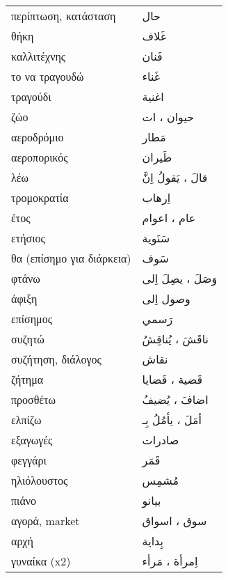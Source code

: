 \documentclass[twocolumn,a4paper]{article}
\newcommand{\ar}[1]{\textarabic{#1}}
\newcommand{\pl}{\raisebox{0.15ex}{\footnotesize ◍}}
\newcommand{\normpl}[1]{\ar{ #1، ات }}
\newcommand{\vrf}{\raisebox{0.15ex}{\footnotesize ◉}}
\newcommand{\mas}{\raisebox{0.15ex}{\footnotesize ◫}}
\begin{document}
\begin{mpsupertabular}{ P{0.5\textwidth} P{0.5\textwidth} }
περίπτωση, κατάσταση         & \ar{ حال } \\
θήκη                         & \ar{ غَلاف } \\
καλλιτέχνης                  & \ar{ فَنان } \\
το να τραγουδώ  \mas         & \ar{ غَناء } \\
τραγούδι                     & \ar{ اغنية } \\
ζώο \pl                      & \normpl{ حيوان } \\
αεροδρόμιο                   & \ar{ مَطار } \\
αεροπορικός                  & \ar{ طَيران } \\

λέω \vrf                     & \ar{ قالَ ، يَقولُ اِنَّ } \\ %
τρομοκρατία                  & \ar{ اِرهاب } \\
έτος \pl                     & \ar{ عام ، اعوام } \\
ετήσιος                      & \ar{ سَنَوية } \\
θα (επίσημο για διάρκεια)    & \ar{ سَوف } \\
φτάνω \vrf                   & \ar{ وَصَلَ ، يصِلَ اِلى } \\ %
άφιξη \mas                   & \ar{ وصول اِلى } \\
επίσημος                     & \ar{ رَسمي } \\
συζητώ \vrf                  & \ar{ ناقَشَ ، يُناقِشُ } \\ %
συζήτηση, διάλογος \mas      & \ar{ نقاش } \\ %
ζήτημα  \pl                  & \ar{ قَضية ، قَضايا } \\
προσθέτω \vrf                & \ar{ اضافَ ، يُضيفُ } \\ %
ελπίζω \vrf                  & \ar{ أمَلَ ، يأمُلُ بِـ } \\ %
εξαγωγές                     & \ar{ صادرات } \\
φεγγάρι                      & \ar{ قَمَر } \\
ηλιόλουστος                  & \ar{ مُشمِس } \\
πιάνο                        & \ar{ بيانو } \\
αγορά, market \pl            & \ar{ سوق ، اسواق } \\
αρχή                         & \ar{ بِداية } \\
γυναίκα (x2)                 & \ar{ اِمرأة ، مَرأء } \\

\end{mpsupertabular}
\end{document}
